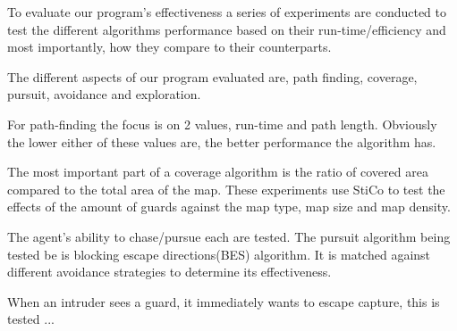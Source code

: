 To evaluate our program's effectiveness a series of experiments are conducted to test the different algorithms performance based on their run-time/efficiency and most importantly, how they compare to their counterparts.

The different aspects of our program evaluated are, path finding, coverage, pursuit, avoidance and exploration.

For path-finding the focus is on 2 values, run-time and path length. Obviously the lower either of these values are, the better performance the algorithm has. 

The most important part of a coverage algorithm is the ratio of covered area compared to the total area of the map. These experiments use StiCo to test the effects of the amount of guards against the map type, map size and map density. 

The agent's ability to chase/pursue each are tested. The pursuit algorithm being tested be is blocking escape directions(BES) algorithm. It is matched against different avoidance strategies to determine its effectiveness.

When an intruder sees a guard, it immediately wants to escape capture, this is tested ...
	